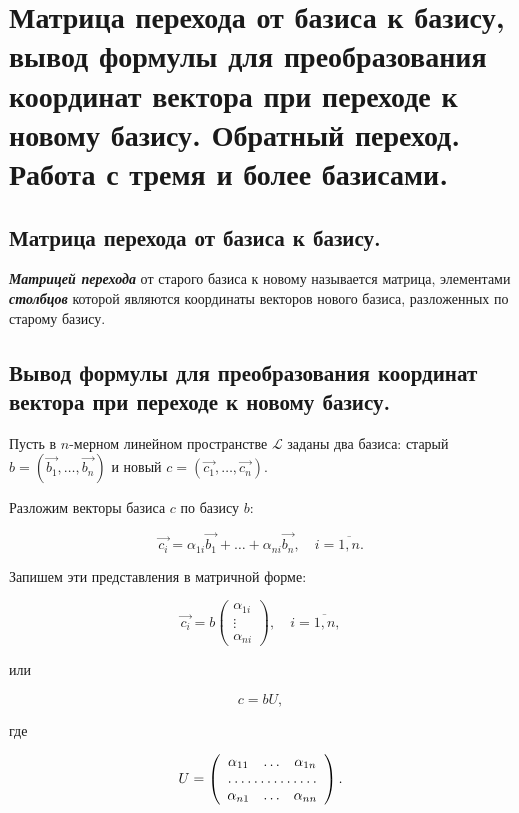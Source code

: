\section{
    Матрица перехода от базиса к базису, вывод формулы для преобразования координат вектора при переходе к новому базису. Обратный переход. Работа с тремя и более базисами.
}

\subsection{
    Матрица перехода от базиса к базису.
}

\begin{definition}
    \textit{\textbf{Матрицей перехода}} от старого базиса к новому называется матрица, элементами \textit{\textbf{столбцов}} которой являются координаты векторов нового базиса, разложенных по старому базису.
    \label{fig:definition_17_1}
\end{definition}

\subsection{
    Вывод формулы для преобразования координат вектора при переходе к новому базису.
}

Пусть в $n$-мерном линейном пространстве $\mathcal{L}$ заданы два базиса: старый $b = (\vec{b_1}, \ldots, \vec{b_n})$ и новый $c = (\vec{c_1}, \ldots, \vec{c_n})$.

Разложим векторы базиса $c$ по базису $b$:

$$\vec{c_i} = \alpha_{1i}\vec{b_1} + \ldots + \alpha_{ni}\vec{b_n}, \quad i = \overline{1, n}.$$

Запишем эти представления в матричной форме:

$$\vec{c_i} = b \begin{pmatrix} \alpha_{1i} \\ \vdots \\ \alpha_{ni} \end{pmatrix}, \quad  i = \overline{1, n},$$

или

$$c = bU,$$

где

\begin{equation*}
    U = \left(\begin{array}{ccc}
        \alpha_{11} & \ldots & \alpha_{1n} \\
        \hdotsfor{3} \\
        \alpha_{n1} & \ldots & \alpha_{nn}
    \end{array}\right).
\end{equation*}


